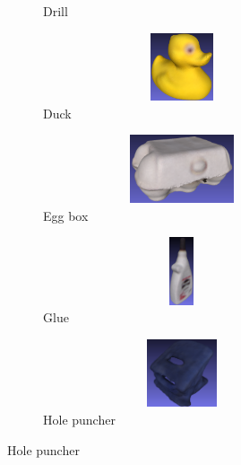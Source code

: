 \documentclass[../main.tex]{subfiles}
\begin{document}
\begin{figure}[H]
\begin{subfigure}[t]{0.19\textwidth}
        \caption{Drill}
        \label{subfig:obj_drill}
    \end{subfigure}
    \begin{subfigure}[t]{0.19\textwidth}
        \centering
        \captionsetup{width=.9\textwidth}
        \includegraphics[width=0.9\textwidth, height=20mm, keepaspectratio]{figures/linemod/duck_obj09.png}
        \caption{Duck}
        \label{subfig:obj_duck}
    \end{subfigure}
    \begin{subfigure}[t]{0.19\textwidth}
        \centering
        \captionsetup{width=.9\textwidth}
        \includegraphics[width=0.9\textwidth, height=20mm, keepaspectratio]{figures/linemod/eggbox_obj10.png}
        \caption{Egg box}
        \label{subfig:obj_eggbox}
    \end{subfigure}
    \begin{subfigure}[t]{0.19\textwidth}
        \centering
        \captionsetup{width=.9\textwidth}
        \includegraphics[width=0.9\textwidth, height=20mm, keepaspectratio]{figures/linemod/glue_obj11.png}
        \caption{Glue}
        \label{subfig:obj_glue}
    \end{subfigure}
    \begin{subfigure}[t]{0.19\textwidth}
        \centering
        \captionsetup{width=.9\textwidth}
        \includegraphics[width=0.9\textwidth, height=20mm, keepaspectratio]{figures/linemod/hole_p_obj12.png}
        \caption{Hole puncher}
        \label{subfig:obj_hole_p}
    \end{subfigure}

\end{figure}
\end{document}
